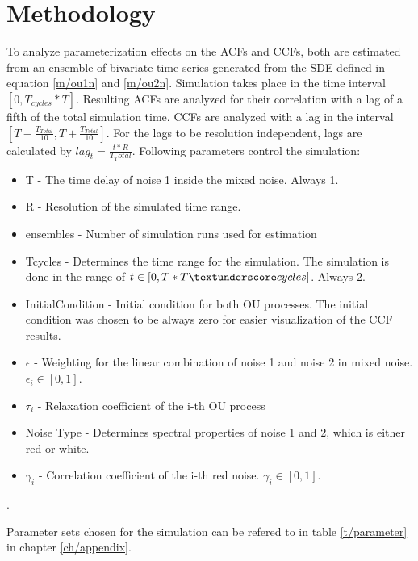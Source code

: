 \documentclass[a4paper,12pt]{book}
\theoremstyle{break}
\begin{document}

\chapter{Methodology}\label{ch/methodology}
To analyze parameterization effects on the \ac{ACF}s and \ac{CCF}s, both are estimated from an ensemble of bivariate time series generated from the \ac{SDE} defined in equation \ref{m/ou1n} and \ref{m/ou2n}. 
Simulation takes place in the time interval $[0, T_{cycles }* T]$.
Resulting \acf{ACF}s are analyzed for their correlation with a lag of a fifth of the total simulation time. 
\ac{CCF}s are analyzed with a lag in the interval $[T - \frac{T_{Total}}{10}, T + \frac{T_{Total}}{10}]$.
For the lags to be resolution independent, lags are calculated by $lag_t=\frac{t*R}{T_Total}$.
Following parameters control the simulation:

\begin{itemize}
	\item T - The time delay of noise 1 inside the mixed noise. Always 1.
	\item R - Resolution of the simulated time range.
	\item ensembles - Number of simulation runs used for estimation
	\item T\textunderscore cycles - Determines the time range for the simulation. The simulation is done in the range of $t\in[0, T*T\textunderscore cycles]  $. Always 2.
	\item Initial\textunderscore Condition - Initial condition for both \ac{OU} processes. The initial condition was chosen to be always zero for easier visualization of the \ac{CCF} results.
	\item $\epsilon$ - Weighting for the linear combination of noise 1 and noise 2 in mixed noise. $\epsilon_i \in [0, 1]$.
	\item $\tau_i$ - Relaxation coefficient of the i-th \ac{OU} process
	\item Noise Type - Determines spectral properties of noise 1 and 2, which is either red or white.
	\item $\gamma_i$ - Correlation coefficient of the i-th red noise. $\gamma_i \in [0, 1]$.
\end{itemize}.

Parameter sets chosen for the simulation can be refered to in table \ref{t/parameter} in chapter \ref{ch/appendix}.
\end{document}
